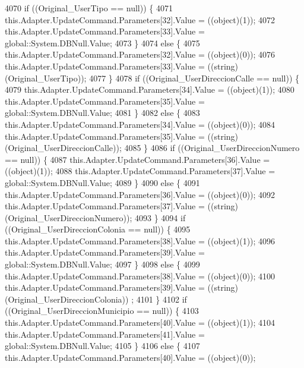 \begin{DoxyCode}
4070             \textcolor{keywordflow}{if} ((Original\_UserTipo == null)) \{
4071                 this.Adapter.UpdateCommand.Parameters[32].Value = ((object)(1));
4072                 this.Adapter.UpdateCommand.Parameters[33].Value = global::System.DBNull.Value;
4073             \}
4074             \textcolor{keywordflow}{else} \{
4075                 this.Adapter.UpdateCommand.Parameters[32].Value = ((object)(0));
4076                 this.Adapter.UpdateCommand.Parameters[33].Value = ((string)(Original\_UserTipo));
4077             \}
4078             \textcolor{keywordflow}{if} ((Original\_UserDireccionCalle == null)) \{
4079                 this.Adapter.UpdateCommand.Parameters[34].Value = ((object)(1));
4080                 this.Adapter.UpdateCommand.Parameters[35].Value = global::System.DBNull.Value;
4081             \}
4082             \textcolor{keywordflow}{else} \{
4083                 this.Adapter.UpdateCommand.Parameters[34].Value = ((object)(0));
4084                 this.Adapter.UpdateCommand.Parameters[35].Value = ((string)(Original\_UserDireccionCalle));
4085             \}
4086             \textcolor{keywordflow}{if} ((Original\_UserDireccionNumero == null)) \{
4087                 this.Adapter.UpdateCommand.Parameters[36].Value = ((object)(1));
4088                 this.Adapter.UpdateCommand.Parameters[37].Value = global::System.DBNull.Value;
4089             \}
4090             \textcolor{keywordflow}{else} \{
4091                 this.Adapter.UpdateCommand.Parameters[36].Value = ((object)(0));
4092                 this.Adapter.UpdateCommand.Parameters[37].Value = ((string)(Original\_UserDireccionNumero));
4093             \}
4094             \textcolor{keywordflow}{if} ((Original\_UserDireccionColonia == null)) \{
4095                 this.Adapter.UpdateCommand.Parameters[38].Value = ((object)(1));
4096                 this.Adapter.UpdateCommand.Parameters[39].Value = global::System.DBNull.Value;
4097             \}
4098             \textcolor{keywordflow}{else} \{
4099                 this.Adapter.UpdateCommand.Parameters[38].Value = ((object)(0));
4100                 this.Adapter.UpdateCommand.Parameters[39].Value = ((string)(Original\_UserDireccionColonia))
      ;
4101             \}
4102             \textcolor{keywordflow}{if} ((Original\_UserDireccionMunicipio == null)) \{
4103                 this.Adapter.UpdateCommand.Parameters[40].Value = ((object)(1));
4104                 this.Adapter.UpdateCommand.Parameters[41].Value = global::System.DBNull.Value;
4105             \}
4106             \textcolor{keywordflow}{else} \{
4107                 this.Adapter.UpdateCommand.Parameters[40].Value = ((object)(0));

\end{DoxyCode}
